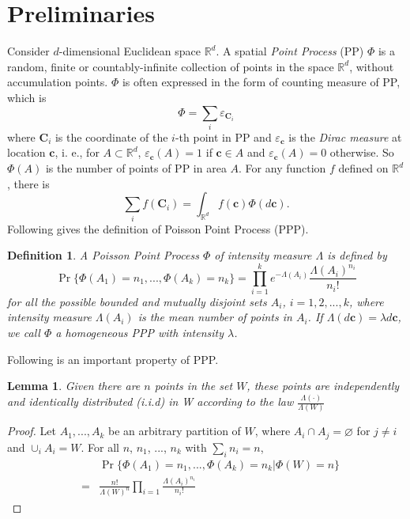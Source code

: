 \documentclass[a4paper,twocolumn]{IEEEtran}
\newtheorem{definition}{\textbf{Definition}}
\newtheorem{lemma}{\textbf{Lemma}}
\begin{document}
\section{Preliminaries}\label{Sec:Preli}
Consider $d$-dimensional Euclidean space $\mathbb{R}^d$. A spatial \emph{Point Process} (PP) $\Phi$ is a random, finite or countably-infinite collection of points in the space $\mathbb{R}^d$, without accumulation points. $\Phi$ is often expressed in the form of counting measure of PP, which is
\begin{displaymath}
\Phi = \sum_i \varepsilon_{\bm{C}_i}
\end{displaymath} 
where $\bm{C}_i$ is the coordinate of the $i$-th point in PP and $\varepsilon_{\bm{c}}$ is the \emph{Dirac measure} at location $\bm{c}$, i. e., for $A \subset \mathbb{R}^d$, $\varepsilon_{\bm{c}}(A)=1$ if $\bm{c} \in A$ and $\varepsilon_{\bm{c}}(A)=0$ otherwise. So $\Phi(A)$ is the number of points of PP in area $A$. For any function $f$ defined on $\mathbb{R}^d$, there is   
\begin{displaymath}
\sum_i f(\bm{C}_i) = \int_{\mathbb{R}^d}f(\bm{c})\Phi(d\bm{c}).
\end{displaymath}
Following gives the definition of Poisson Point Process (PPP).
\begin{definition}
A Poisson Point Process $\Phi$ of intensity measure $\Lambda$ is defined by
\begin{equation}
\Pr\{\Phi(A_1) = n_1, ..., \Phi(A_k) = n_k\} = \prod_{i=1}^{k} e^{-\Lambda(A_i)}\frac{\Lambda(A_i)^{n_i}}{n_i !}
\end{equation}
for all the possible bounded and mutually disjoint sets $A_i$, $i = 1,2, ..., k$, where intensity measure $\Lambda(A_i)$ is the mean number of points in $A_i$. If $\Lambda(d\bm{c}) = \lambda d\bm{c}$, we call $\Phi$ a homogeneous PPP with intensity $\lambda$.  
\end{definition}

Following is an important property of PPP.
\begin{lemma}
	Given there are $n$ points in the set $W$, these points are independently and identically distributed (i.i.d) in W according to the law $\frac{\Lambda(\cdot)}{\Lambda(W)}$
\end{lemma}
\begin{proof}
	Let $A_1, ..., A_k$ be an arbitrary partition of $W$, where $A_i \cap A_j = \varnothing$ for $j \neq i$ and $\cup_i A_i = W$. For all $n$, $n_1$, ..., $n_k$ with $\sum_i n_i = n$,
	\begin{eqnarray}
	&&\Pr\{\Phi(A_1) = n_1, ..., \Phi(A_k) = n_k | \Phi(W) = n\}\nonumber\\
	&=&\frac{n!}{\Lambda(W)^n}\prod_{i=1}\frac{\Lambda(A_i)^{n_i}}{n_i!}\nonumber
	\end{eqnarray}
\end{proof}
\end{document}
